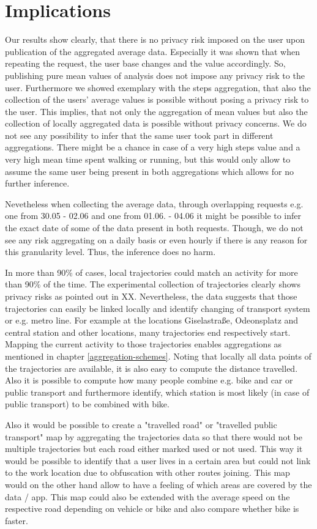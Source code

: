 \section{Implications}
Our results show clearly, that there is no privacy risk imposed on the user upon publication of the aggregated average data. Especially it was shown that when repeating the request, the user base changes and the value accordingly. So, publishing pure mean values of analysis does not impose any privacy risk to the user. Furthermore we showed exemplary with the steps aggregation, that also the collection of the users' average values is possible without posing a privacy risk to the user. This implies, that not only the aggregation of mean values but also the collection of locally aggregated data is possible without privacy concerns. We do not see any possibility to infer that the same user took part in different aggregations. There might be a chance in case of a very high steps value and a very high mean time spent walking or running, but this would only allow to assume the same user being present in both aggregations which allows for no further inference.

Nevetheless when collecting the average data, through overlapping requests e.g. one from 30.05 - 02.06 and one from 01.06. - 04.06 it might be possible to infer the exact date of some of the data present in both requests. Though, we do not see any risk aggregating on a daily basis or even hourly if there is any reason for this granularity level. Thus, the inference does no harm.

In more than 90\% of cases, local trajectories could match an activity for more than 90\% of the time.
The experimental collection of trajectories clearly shows privacy risks as pointed out in XX. Nevertheless, the data suggests that those trajectories can easily be linked locally and identify changing of transport system or e.g. metro line. For example at the locations Giselastraße, Odeonsplatz and central station and other locations, many trajectories end respectively start. Mapping the current activity to those trajectories enables aggregations as mentioned in chapter \ref{aggregation-schemes}. Noting that locally all data points of the trajectories are available, it is also easy to compute the distance travelled. Also it is possible to compute how many people combine e.g. bike and car or public transport and furthermore identify, which station is most likely (in case of public transport) to be combined with bike.


Also it would be possible to create a "travelled road" or "travelled public transport" map by aggregating the trajectories data so that there would not be multiple trajectories but each road either marked used or not used. This way it would be possible to identify that a user lives in a certain area but could not link to the work location due to obfuscation with other routes joining. This map would on the other hand allow to have a feeling of which areas are covered by the data / app. This map could also be extended with the average speed on the respective road depending on vehicle or bike and also compare whether bike is faster.

